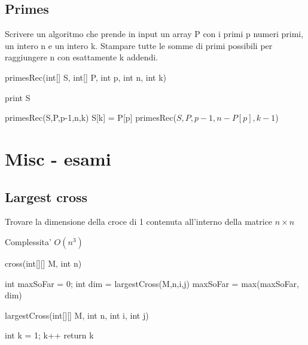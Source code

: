 \documentclass[oneside]{book}
\begin{document}
\section{Primes}
Scrivere un algoritmo che prende in input un array P con i primi p numeri primi, un intero n e un intero k. Stampare tutte le somme di primi possibili per raggiungere n con esattamente k addendi. 

\begin{algorithm}
\caption{primesRec(int[] S, int[] P, int p, int n, int k)\label{alg:cap}}
\begin{algorithmic}
	\State print S
\EndIf

	\State primesRec(S,P,p-1,n,k)
	\State S[k] = P[p]
	\State primesRec($S,P,p-1,n-P[p],k-1$)
\EndIf
\end{algorithmic}
\end{algorithm}
\chapter{Misc - esami}

\section{Largest cross}
Trovare la dimensione della croce di 1 contenuta all'interno della matrice $n\times n$ 

Complessita' $O(n^3)$

\begin{algorithm}
\caption{cross(int[][] M, int n)\label{alg:cap}}
\begin{algorithmic}
\State int maxSoFar = 0;
			int dim = largestCross(M,n,i,j)
			maxSoFar = max(maxSoFar, dim)
		\EndIf
	\EndFor

\EndFor
\end{algorithmic}
\end{algorithm}

\begin{algorithm}
\caption{largestCross(int[][] M, int n, int i, int j)}
\begin{algorithmic}
\State int k = 1;
	\State k++
\EndWhile
\State return k
\end{algorithmic}
\end{algorithm}
\end{document}
